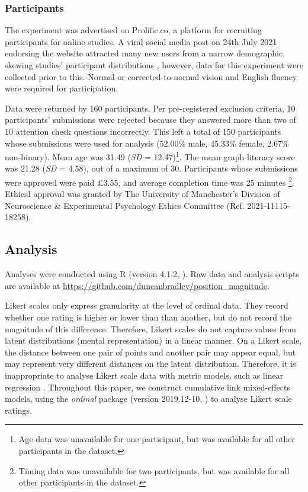\documentclass[journal]{vgtc}                %
\begin{document}
\hypertarget{participants}{%
\subsubsection{Participants}\label{participants}}

The experiment was advertised on Prolific.co, a platform for recruiting
participants for online studies. A viral social media post on 24th July
2021 endorsing the website attracted many new users from a narrow
demographic, skewing studies' participant distributions
\citep{charalambides_we_2021}, however, data for this experiment were
collected prior to this. Normal or corrected-to-normal vision and
English fluency were required for participation.

Data were returned by 160 participants. Per pre-registered exclusion
criteria, 10 participants' submissions were rejected because they
answered more than two of 10 attention check questions incorrectly. This
left a total of 150 participants whose submissions were used for
analysis (52.00\% male, 45.33\%
female, 2.67\% non-binary). Mean age was
31.49 (\emph{SD} = 12.47)\footnote{Age data was unavailable for one participant, but was available
  for all other participants in the dataset.}. The mean
graph literacy score was 21.28 (\emph{SD} =
4.58), out of a maximum of 30. Participants
whose submissions were approved were paid £3.55, and average completion
time was 25 minutes \footnote{Timing data was unavailable for two participants, but was
  available for all other participants in the dataset.}. Ethical
approval was granted by The University of Manchester's Division of
Neuroscience \& Experimental Psychology Ethics Committee (Ref.
2021-11115-18258).

\hypertarget{analysis}{%
\subsection{Analysis}\label{analysis}}

Analyses were conducted using R (version 4.1.2, \citep{r_core_team_r_2021}). Raw
data and analysis scripts are available at
\url{https://github.com/duncanbradley/position_magnitude}.

Likert scales only express granularity at the level of ordinal data.
They record whether one rating is higher or lower than than another, but
do not record the magnitude of this difference. Therefore, Likert scales
do not capture values from latent distributions (mental representation)
in a linear manner. On a Likert scale, the distance between one pair of
points and another pair may appear equal, but may represent very
different distances on the latent distribution. Therefore, it is
inappropriate to analyse Likert scale data with metric models, such as
linear regression \citep{liddell_analyzing_2018}. Throughout this paper, we
construct cumulative link mixed-effects models, using the \emph{ordinal}
package (version 2019.12-10, \citep{christensen_ordinalregression_2019}) to analyse Likert scale
ratings.
\end{document}
